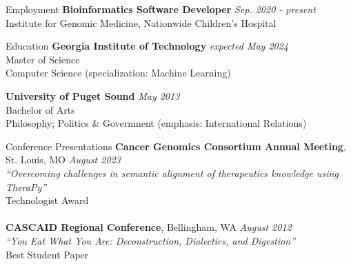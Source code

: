 \documentclass{cv} %
\begin{document}
\begin{rSection}{Employment}
{\bf Bioinformatics Software Developer} \hfill {\em Sep. 2020 - present}\\
Institute for Genomic Medicine, Nationwide Children's Hospital
\end{rSection}


\begin{rSection}{Education}
{\bf Georgia Institute of Technology} \hfill {\em expected May 2024}\\
Master of Science\\
Computer Science (specialization: Machine Learning)

{\bf University of Puget Sound} \hfill {\em May 2013}\\
Bachelor of Arts\\
Philosophy; Politics \& Government (emphasis: International Relations)
\end{rSection}


\begin{rSection}{Conference Presentations}
{\bf Cancer Genomics Consortium Annual Meeting}{, St. Louis, MO} \hfill {\em August 2023}\\
{\em ``Overcoming challenges in semantic alignment of therapeutics knowledge using TheraPy''}\\
{Technologist Award}\\
\\
{\bf CASCAID Regional Conference}{, Bellingham, WA} \hfill {\em August 2012}\\
{\em ``You Eat What You Are: Deconstruction, Dialectics, and Digestion''}\\
{Best Student Paper}

\end{rSection}

\end{document}
